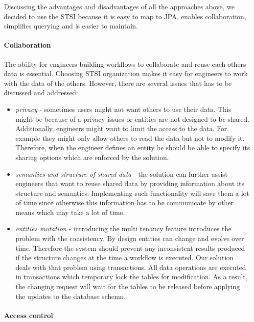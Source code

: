 \documentclass[a4paper, notitlepage]{article}
\begin{document}
Discussing the advantages and disadvantages of all the approaches above, we decided to use the STSI because it is easy to map to JPA, enables collaboration, simplifies querying and is easier to maintain.    

\paragraph{Collaboration}
The ability for engineers building workflows to collaborate and reuse each others data is essential. Choosing STSI organization makes it easy for engineers to work with the data of the others. However, there are several issues that has to be discussed and addressed:

\begin{itemize}

	\item \textit{privacy} - sometimes users might not want others to use their data. This might be because of a privacy issues or entities are not designed to be shared. Additionally, engineers might want to limit the access to the data. For example they might only allow others to read the data but not to modify it. Therefore, when the engineer defines an entity he should be able to specify its sharing options which are enforced by the solution.
	 
	\item \textit{semantics and structure of shared data} - the solution can further assist engineers that want to reuse shared data by providing information about its structure and semantics. Implementing such functionality will save them a lot of time since otherwise this information has to be communicate by other means which may take a lot of time.
	
	\item \textit{entities mutation} - introducing the multi tenancy feature introduces the problem with the consistency. By design entities can change and evolve over time. Therefore the system should prevent any inconsistent results produced if the structure changes at the time a workflow is executed. Our solution deals with that problem using transactions. All data operations are executed in transactions which temporary lock the tables for modification. As a result, the changing request will wait for the tables to be released before applying the updates to the database schema.
\end{itemize}


\paragraph{Access control}
\end{document}
